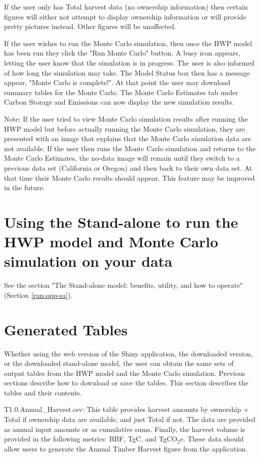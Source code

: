 \documentclass[
]{book}
\begin{document}
If the user only has Total harvest data (no ownership information) then certain figures will either not attempt to display ownership information or will provide pretty pictures instead. Other figures will be unaffected.

If the user wishes to run the Monte Carlo simulation, then once the HWP model has been run they click the "Run Monte Carlo" button. A busy icon appears, letting the user know that the simulation is in progress. The user is also informed of how long the simulation may take. The Model Status box then has a message appear, "Monte Carlo is complete!". At that point the user may download summary tables for the Monte Carlo. The Monte Carlo Estimates tab under Carbon Storage and Emissions can now display the new simulation results.

Note: If the user tried to view Monte Carlo simulation results after running the HWP model but before actually running the Monte Carlo simulation, they are presented with an image that explains that the Monte Carlo simulation data are not available. If the user then runs the Monte Carlo simulation and returns to the Monte Carlo Estimates, the no-data image will remain until they switch to a previous data set (California or Oregon) and then back to their own data set. At that time their Monte Carlo results should appear. This feature may be improved in the future.

\hypertarget{own-sa}{%
\section{Using the Stand-alone to run the HWP model and Monte Carlo simulation on your data}\label{own-sa}}

See the section "The Stand-alone model: benefits, utility, and how to operate" (Section \ref{run-opp-sa}).

\hypertarget{own-tables}{%
\section{Generated Tables}\label{own-tables}}

Whether using the web version of the Shiny application, the downloaded version, or the downloaded stand-alone model, the user can obtain the same sets of output tables from the HWP model and the Monte Carlo simulation. Previous sections describe how to download or save the tables. This section describes the tables and their contents.

T1.0.Annual\_Harvest.csv: This table provides harvest amounts by ownership + Total if ownership data are available, and just Total if not. The data are provided as annual input amounts or as cumulative sums. Finally, the harvest volume is provided in the following metrics: BBF, TgC, and TgCO\(_2\)e. These data should allow users to generate the Annual Timber Harvest figure from the application.
\end{document}
